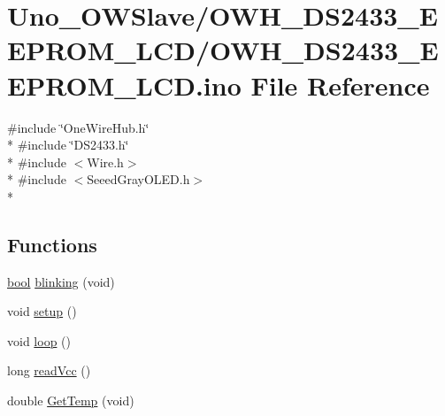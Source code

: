 \hypertarget{OWH__DS2433__EEPROM__LCD_8ino}{\section{Uno\-\_\-\-O\-W\-Slave/\-O\-W\-H\-\_\-\-D\-S2433\-\_\-\-E\-E\-P\-R\-O\-M\-\_\-\-L\-C\-D/\-O\-W\-H\-\_\-\-D\-S2433\-\_\-\-E\-E\-P\-R\-O\-M\-\_\-\-L\-C\-D.ino File Reference}
\label{OWH__DS2433__EEPROM__LCD_8ino}
}
{\ttfamily \#include \char`\"{}One\-Wire\-Hub.\-h\char`\"{}}\\*
{\ttfamily \#include \char`\"{}D\-S2433.\-h\char`\"{}}\\*
{\ttfamily \#include $<$Wire.\-h$>$}\\*
{\ttfamily \#include $<$Seeed\-Gray\-O\-L\-E\-D.\-h$>$}\\*
\subsection*{Functions}
\begin{DoxyCompactItemize}
\item 
\hyperlink{stdbool_8h_abb452686968e48b67397da5f97445f5b}{bool} \hyperlink{OWH__DS2433__EEPROM__LCD_8ino_a6766eee584b84ead350781efbabe36d7}{blinking} (void)
\item 
void \hyperlink{OWH__DS2433__EEPROM__LCD_8ino_a4fc01d736fe50cf5b977f755b675f11d}{setup} ()
\item 
void \hyperlink{OWH__DS2433__EEPROM__LCD_8ino_afe461d27b9c48d5921c00d521181f12f}{loop} ()
\item 
long \hyperlink{OWH__DS2433__EEPROM__LCD_8ino_a8e23c9421f6663303ea22e4969e2f6c1}{read\-Vcc} ()
\item 
double \hyperlink{OWH__DS2433__EEPROM__LCD_8ino_a0a60fd2316c16170dc7aa6aa0f5f485d}{Get\-Temp} (void)
\end{DoxyCompactItemize}
